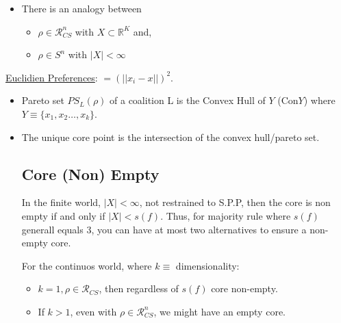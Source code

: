\documentclass{article}
\newcommand{\RR}{\mathbb{R}}
\newcommand{\R}{\mathcal{R}}
\begin{document}
\bigskip

\begin{itemize}

\item There is an analogy between 
\begin{itemize}

\item $\rho \in \R^n_{CS} $ with $X\subset \RR^K$ and,
\item  $\rho \in S^n$ with $|X|<\infty$
\end{itemize}
\end{itemize}

\underline{Euclidien Preferences}: $=(||x_i-x|| )^2$.
\begin{itemize}

\item Pareto set $PS_L(\rho)$ of a coalition L is the Convex Hull of $Y$ (Con$Y$) where $Y\equiv \{x_1,x_2 \dots, x_k\}$.

\item The unique core point is the intersection of the convex hull/pareto set.

\subsection*{Core (Non) Empty}
In the finite world, $|X|<\infty$, not restrained to S.P.P, then the core is non empty if and only if $|X|<s(f)$. Thus, for majority rule where $s(f)$ generall equals 3, you can have at most two alternatives to ensure a non-empty core.

For the continuos world, where $k\equiv$ dimensionality:

\begin{itemize}
  \item $k=1, \rho \in \R_{CS}$, then regardless of $s(f)$ core non-empty. 
  \item If $k>1$, even with $\rho \in \R^n_{CS}$, we might have an empty core.
\end{itemize}


\end{itemize}
\end{document}
